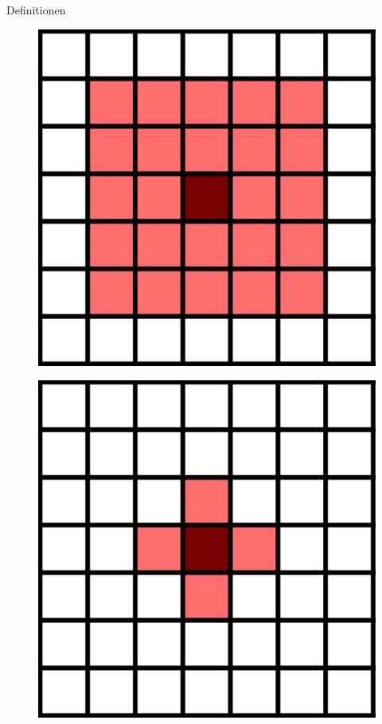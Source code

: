 \documentclass[aspectratio=169]{beamer}
\begin{document}
\begin{frame}{Definitionen}
\begin{multicols*}{2}
\begin{multicols*}{2}
        \begin{figure}[H]
          \centering
          \includegraphics[width = 0.28 \textheight]{moore_2.png}
        \end{figure}

      \end{multicols*}


      \vfill\null


      \begin{multicols*}{2}
      \begin{figure}[H]
        \centering
        \includegraphics[width = 0.28 \textheight]{von_Neumann_1.png}
      \end{figure}


\end{multicols*}
\end{multicols*}
\end{frame}
\end{document}
